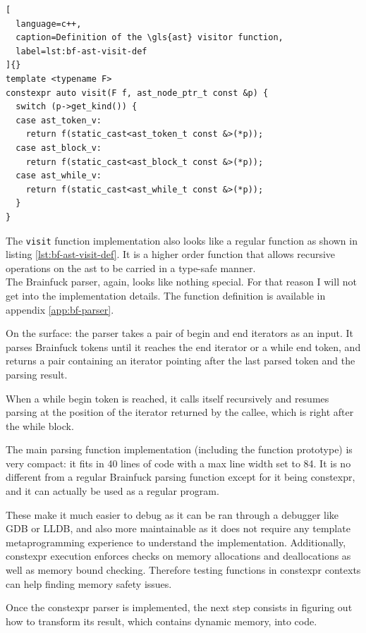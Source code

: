 \documentclass[../main]{subfiles}
\begin{document}
\clearpage%

\begin{lstlisting}[
  language=c++,
  caption=Definition of the \gls{ast} visitor function,
  label=lst:bf-ast-visit-def
]{}
template <typename F>
constexpr auto visit(F f, ast_node_ptr_t const &p) {
  switch (p->get_kind()) {
  case ast_token_v:
    return f(static_cast<ast_token_t const &>(*p));
  case ast_block_v:
    return f(static_cast<ast_block_t const &>(*p));
  case ast_while_v:
    return f(static_cast<ast_while_t const &>(*p));
  }
}
\end{lstlisting}

The \lstinline{visit} function implementation also looks like a regular \cpp
function as shown in listing \ref{lst:bf-ast-visit-def}.
It is a higher order function that allows recursive operations on the \gls{ast}
to be carried in a type-safe manner.
\\

The Brainfuck parser, again, looks like nothing special. For that reason I will
not get into the implementation details. The function definition is available
in appendix \ref{app:bf-parser}.

On the surface: the parser takes a pair of begin and end iterators as an input.
It parses Brainfuck tokens until it reaches the end iterator or a while end
token, and returns a pair containing an iterator pointing after the last parsed
token and the parsing result.

When a while begin token is reached, it calls itself recursively and resumes
parsing at the position of the iterator returned by the callee, which is right
after the while block.

The main parsing function implementation (including the function prototype)
is very compact: it fits in 40 lines of code with a max line width set to 84.
It is no different from a regular Brainfuck parsing function except for it being
\gls{constexpr}, and it can actually be used as a regular \cpp program.

These make it much easier to debug as it can be ran through a \cpp debugger like
GDB or LLDB, and also more maintainable as it does not require any
template metaprogramming experience to understand the implementation.
Additionally, \gls{constexpr} execution enforces checks on memory allocations and
deallocations as well as memory bound checking. Therefore testing functions
in \gls{constexpr} contexts can help finding memory safety issues.

Once the \gls{constexpr} parser is implemented, the next step consists in
figuring out how to transform its result, which contains dynamic memory,
into \cpp code.
\end{document}
